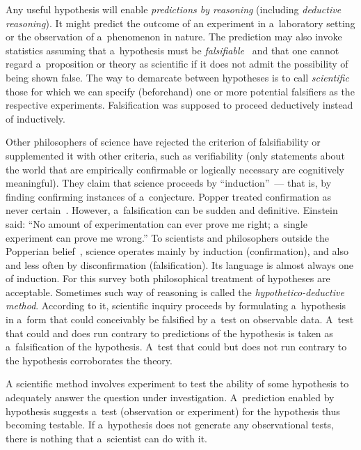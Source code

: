 \begin{multicols}{2}
  Any useful hypothesis will enable \textit{predictions by reasoning} (including
\textit{deductive reasoning}). It might predict the outcome of an experiment in a~laboratory setting or the observation of a~phenomenon in nature. The prediction may
also invoke statistics assuming that a~hypothesis must be
  \textit{falsifiable}~\cite{8-kl} and that one cannot regard a~proposition or theory
as scientific if it does not admit the possibility of being shown false. The way to
demarcate between hypotheses is to call \textit{scientific} those for which we can
specify (beforehand) one or more potential falsifiers as the respective experiments.
Falsification was supposed to proceed deductively instead of inductively.
{

}

  Other philosophers of science have rejected the criterion of falsifiability or
supplemented it with other criteria, such as verifiability (only statements about the
world that are empirically confirmable or logically necessary are cognitively
meaningful). They claim that science proceeds by ``induction''~--- that is, by finding
confirming instances of a~conjecture. Popper treated confirmation as never
certain~\cite{8-kl}. However, a~falsification can be sudden and definitive. Einstein
said: ``No amount of experimentation can ever prove me right; a~single experiment
can prove me wrong.'' To scientists and philosophers outside the Popperian
belief~\cite{8-kl}, science operates mainly by induction (confirmation), and also and
less often by disconfirmation (falsification). Its language is almost always one of
induction. For this survey both philosophical treatment of hypotheses are acceptable.
Sometimes such way of reasoning is called the \textit{hypothetico-deductive
method}. According to it, scientific inquiry proceeds by formulating a~hypothesis in a~form that could conceivably be falsified by a~test on observable data. A~test that
could and does run contrary to predictions of the hypothesis is taken as a~falsification
of the hypothesis. A~test that could but does not run contrary to the hypothesis
corroborates the theory.
{

}

  A scientific method involves experiment to test the ability of some hypothesis to
adequately answer the question under investigation. A~prediction enabled by
hypothesis suggests a~test (observation or experiment) for the hypothesis thus
becoming testable. If a~hypothesis does not generate any observational tests, there is
nothing that a~scientist can do with it.


\end{multicols}
